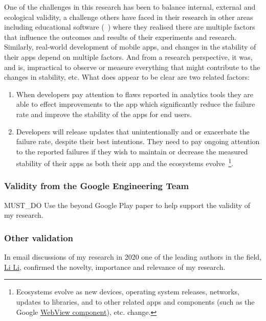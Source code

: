 One of the challenges in this research has been to balance internal, external and ecological validity, a challenge others have faced in their research in other areas including educational software (~\cite{ransdell1993educational_software_evaluation_research_validities}) where they realised there are multiple factors that influence the outcomes and results of their experiments and research. Similarly, real-world development of mobile apps, and changes in the stability of their apps depend on multiple factors. And from a research perspective, it was, and is, impractical to observe or measure everything that might contribute to the changes in stability, etc. What does appear to be clear are two related factors:

\begin{enumerate}
    \item When developers pay attention to flaws reported in analytics tools they are able to effect improvements to the app which significantly reduce the failure rate and improve the stability of the apps for end users.
    \item Developers will release updates that unintentionally and or exacerbate the failure rate, despite their best intentions. They need to pay ongoing attention to the reported failures if they wish to maintain or decrease the measured stability of their apps as both their app and the ecosystems evolve~\footnote{Ecosystems evolve as new devices, operating system releases, networks, updates to libraries, and to other related apps and components (such as the Google \href{ection-webview-component}{WebView component}), etc. change.}.
\end{enumerate}

\subsubsection{Validity from the Google Engineering Team}

MUST\_DO Use the beyond Google Play paper to help support the validity of my research.

\subsubsection{Other validation}
In email discussions of my research in 2020 one of the leading authors in the field, \href{https://scholar.google.com/citations?user=zuUsFkgAAAAJ&hl=en&oi=sra}{Li Li}, confirmed the novelty, importance and relevance of my research.



